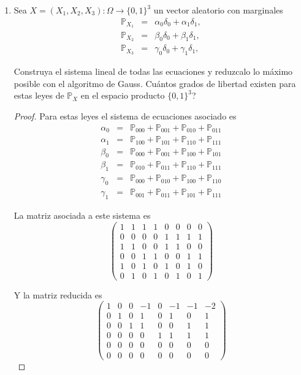 \documentclass[paper=letter, fontsize=11pt]{scrartcl} %
\numberwithin{equation}{section} %
\numberwithin{figure}{section} %
\numberwithin{table}{section} %
\newcommand{\pr}[1]{\mathbb{P}_{#1}}
\begin{document}
\begin{enumerate}[label = \arabic*)]
\item Sea $ X = (X_1,X_2,X_3):\Omega \to \{0,1\}^3 $ un vector aleatorio con marginales
\begin{eqnarray}
\mathbb{P}_{X_1}&=&\alpha_0\delta_0+\alpha_1\delta_1, \nonumber
\\\mathbb{P}_{X_2}&=&\beta_0\delta_0+\beta_1\delta_1, \nonumber
\\\mathbb{P}_{X_3}&=&\gamma_0\delta_0+\gamma_1\delta_1, \nonumber
\end{eqnarray}

Construya el sistema lineal de todas las ecuaciones y reduzcalo lo máximo posible con el algoritmo de Gauss. Cuántos grados de libertad existen para estas leyes de $ \mathbb{P}_X $ en el espacio producto $ \{0,1\}^3 $? 

\begin{proof}
Para estas leyes el sistema de ecuaciones asociado es
\begin{eqnarray}
\alpha_0 &=& \pr{000}+\pr{001}+\pr{010}+\pr{011} \nonumber
\\\alpha_1 &=& \pr{100}+\pr{101}+\pr{110}+\pr{111} \nonumber
\\\beta_0 &=& \pr{000}+\pr{001}+\pr{100}+\pr{101} \nonumber
\\\beta_1 &=& \pr{010}+\pr{011}+\pr{110}+\pr{111} \nonumber
\\\gamma_0 &=& \pr{000}+\pr{010}+\pr{100}+\pr{110} \nonumber
\\\gamma_1 &=& \pr{001}+\pr{011}+\pr{101}+\pr{111} \nonumber
\end{eqnarray}

La matriz asociada a este sistema es
\begin{equation}
\begin{pmatrix}
 1 & 1 & 1 & 1 & 0 & 0 & 0 & 0 \\
 0 & 0 & 0 & 0 & 1 & 1 & 1 & 1 \\
 1 & 1 & 0 & 0 & 1 & 1 & 0 & 0 \\
 0 & 0 & 1 & 1 & 0 & 0 & 1 & 1 \\
 1 & 0 & 1 & 0 & 1 & 0 & 1 & 0 \\
 0 & 1 & 0 & 1 & 0 & 1 & 0 & 1
\end{pmatrix}\nonumber
\end{equation}

Y la matriz reducida es
\begin{equation}
\begin{pmatrix}
 1 & 0 & 0 & -1 & 0 & -1 & -1 & -2 \\
 0 & 1 & 0 & 1 & 0 & 1 & 0 & 1 \\
 0 & 0 & 1 & 1 & 0 & 0 & 1 & 1 \\
 0 & 0 & 0 & 0 & 1 & 1 & 1 & 1 \\
 0 & 0 & 0 & 0 & 0 & 0 & 0 & 0 \\
 0 & 0 & 0 & 0 & 0 & 0 & 0 & 0
\end{pmatrix} \nonumber
\end{equation}


\end{proof}
\end{enumerate}
\end{document}
